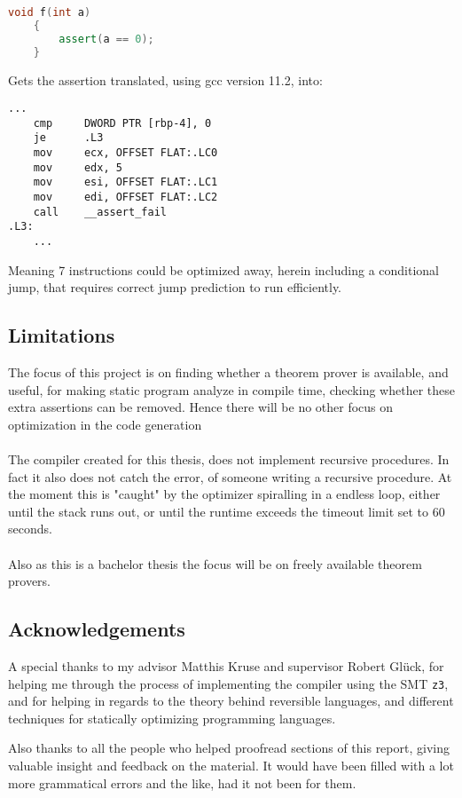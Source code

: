 \begin{lstlisting}[language=c++]
    void f(int a)
    {
        assert(a == 0);
    }
\end{lstlisting}
\noindent
Gets the assertion translated, using gcc version 11.2, into:

\begin{lstlisting}[language={[x86masm]Assembler}]
    ...
    cmp     DWORD PTR [rbp-4], 0
    je      .L3
    mov     ecx, OFFSET FLAT:.LC0
    mov     edx, 5
    mov     esi, OFFSET FLAT:.LC1
    mov     edi, OFFSET FLAT:.LC2
    call    __assert_fail
.L3:
    ...
\end{lstlisting}
\noindent
Meaning 7 instructions could be optimized away, herein including a conditional jump,
that requires correct jump prediction to run efficiently.


\subsection{Limitations }
The focus of this project is on finding whether a theorem prover is available, and useful,
for making static
program analyze in compile time, checking whether these extra assertions can be removed. Hence
there will be no other focus on optimization in the code generation
\\
\\
The compiler created for this thesis, does not implement recursive procedures. In fact it also
does not catch the error, of someone writing a recursive procedure. At the moment this is "caught"
by the optimizer spiralling in a endless loop, either until the stack runs out, or until the
runtime exceeds the timeout limit set to $60$ seconds.
\\
\\
Also as this is a bachelor thesis the focus will be on freely available theorem provers.

\subsection{Acknowledgements }
A special thanks to my advisor Matthis Kruse and supervisor Robert Glück, for helping me through
the process of implementing the compiler using the SMT \texttt{z3}, and for helping in regards to
the theory behind reversible languages, and different techniques for statically optimizing
programming languages.

Also thanks to all the people who helped proofread sections of this report, giving valuable
insight and feedback on the material. It would have been filled with a lot more grammatical errors
and the like, had it not been for them.